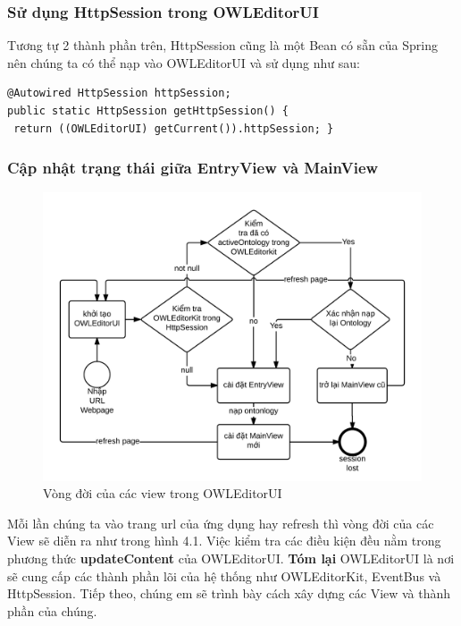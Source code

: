 \subsubsection{Sử dụng HttpSession trong OWLEditorUI}
Tương tự 2 thành phần trên, HttpSession cũng là một Bean có sẵn của Spring nên chúng ta có thể nạp vào OWLEditorUI và sử dụng như sau:
\begin{verbatim}
@Autowired HttpSession httpSession;
public static HttpSession getHttpSession() {
 return ((OWLEditorUI) getCurrent()).httpSession; }
\end{verbatim}
\subsubsection{Cập nhật trạng thái giữa EntryView và MainView}
\begin{figure}[h!]
	\centering
	\includegraphics[width=150mm]{Figures/owleditorui_flowchart.png}
	\caption{Vòng đời của các view trong OWLEditorUI \label{overflow}}
\end{figure}
Mỗi lần chúng ta vào trang url của ứng dụng hay refresh thì vòng đời của các View sẽ diễn ra như trong hình 4.1. Việc kiểm tra các điều kiện đều nằm trong phương thức \textbf{updateContent} của OWLEditorUI.
\textbf{Tóm lại} OWLEditorUI là nơi sẽ cung cấp các thành phần lõi của hệ thống như OWLEditorKit, EventBus và HttpSession. Tiếp theo, chúng em sẽ trình bày cách xây dựng các View và thành phần của chúng.
